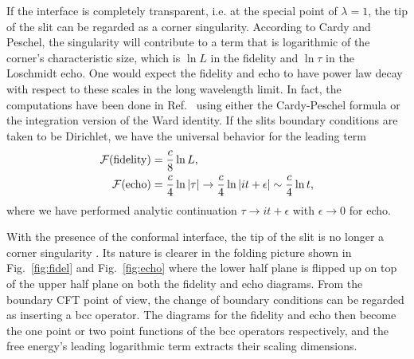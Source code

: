 If the interface is completely transparent, i.e. at the special point of $\lambda = 1$, the tip of the slit can be regarded as a corner singularity. According to Cardy and Peschel\cite{cardy_finite-size_1988}, the singularity will contribute to a term that is logarithmic of the corner's characteristic size, which is $\ln L$ in the fidelity and $\ln \tau$ in the Loschmidt echo. One would expect the fidelity and echo to have power law decay with respect to these scales in the long wavelength limit. In fact, the computations have been done in Ref.~ using either the Cardy-Peschel formula or the integration version of the Ward identity. If the slits boundary conditions are taken to be Dirichlet, we have the universal behavior for the leading term \cite{stephan_logarithmic_2013,stephan_local_2011}
\begin{equation}
\label{eq:full-pass}
\begin{aligned}
  \mathcal{F}({\rm fidelity}) &=  \frac{c}{8} \ln L, \\
 \mathcal{F}( {\rm echo} )  &= \frac{c}{4} \ln |\tau| \rightarrow \frac{c}{4} \ln |it + \epsilon|   \sim \frac{c}{4}\ln t ,
\end{aligned}
\end{equation}
where we have performed analytic continuation $\tau \rightarrow it + \epsilon$ with $\epsilon \rightarrow 0$ for echo.

With the presence of the conformal interface, the tip of the slit is no longer a corner singularity\cite{cardy_finite-size_1988} . Its nature is clearer in the folding picture shown in Fig.~\ref{fig:fidel} and Fig.~\ref{fig:echo} where the lower half plane is flipped up on top of the upper half plane on both the fidelity and echo diagrams. From the boundary CFT point of view, the change of boundary conditions can be regarded as inserting a bcc operator. The diagrams for the fidelity and echo then become the one point or two point functions of the bcc operators respectively, and the free energy's leading logarithmic term extracts their scaling dimensions. 


